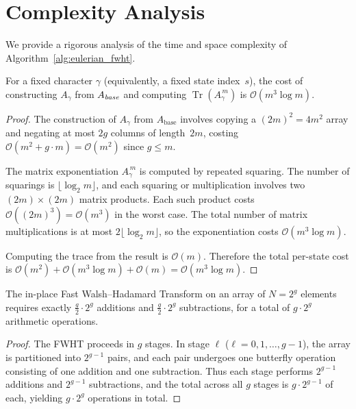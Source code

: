 \documentclass[acmsmall,review]{acmart}
\newcommand{\bigO}{\mathcal{O}}
\DeclareMathOperator{\Tr}{Tr}
\begin{document}
	\section{Complexity Analysis}
	\label{sec:complexity}
	
	We provide a rigorous analysis of the time and space complexity of Algorithm~\ref{alg:eulerian_fwht}.
	
	\begin{lemma}
		\label{lem:per_state}
		For a fixed character $\gamma$ (equivalently, a fixed state index~$s$), the cost of constructing $A_\gamma$ from $A_{\emph{base}}$ and computing $\Tr(A_\gamma^{\,m})$ is $\bigO(m^3 \log m)$.
	\end{lemma}
	\begin{proof}
		The construction of $A_\gamma$ from $A_{\text{base}}$ involves copying a $(2m)^2 = 4m^2$ array and negating at most $2g$ columns of length~$2m$, costing $\bigO(m^2 + g \cdot m) = \bigO(m^2)$ since $g \le m$.
		
		The matrix exponentiation $A_\gamma^{\,m}$ is computed by repeated squaring. The number of squarings is $\lfloor \log_2 m \rfloor$, and each squaring or multiplication involves two $(2m) \times (2m)$ matrix products. Each such product costs $\bigO((2m)^3) = \bigO(m^3)$ in the worst case. The total number of matrix multiplications is at most $2\lfloor \log_2 m \rfloor$, so the exponentiation costs $\bigO(m^3 \log m)$.
		
		Computing the trace from the result is $\bigO(m)$. Therefore the total per-state cost is $\bigO(m^2) + \bigO(m^3 \log m) + \bigO(m) = \bigO(m^3 \log m)$.
	\end{proof}
	
	\begin{lemma}
		\label{lem:fwht}
		The in-place Fast Walsh--Hadamard Transform on an array of $N = 2^g$ elements requires exactly $\frac{g}{2} \cdot 2^g$ additions and $\frac{g}{2} \cdot 2^g$ subtractions, for a total of $g \cdot 2^g$ arithmetic operations.
	\end{lemma}
	\begin{proof}
		The FWHT proceeds in $g$ stages. In stage $\ell$ ($\ell = 0, 1, \ldots, g-1$), the array is partitioned into $2^{g-1}$ pairs, and each pair undergoes one butterfly operation consisting of one addition and one subtraction. Thus each stage performs $2^{g-1}$ additions and $2^{g-1}$ subtractions, and the total across all $g$ stages is $g \cdot 2^{g-1}$ of each, yielding $g \cdot 2^g$ operations in total.
	\end{proof}
	
\end{document}

